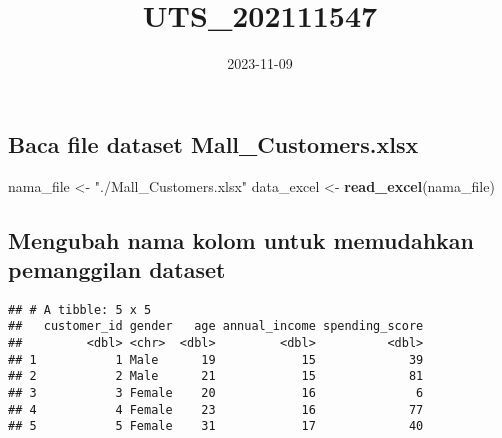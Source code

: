 \documentclass[
]{article}
\title{UTS\_202111547}
\author{}
\date{\vspace{-2.5em}2023-11-09}
\newenvironment{Shaded}{\begin{snugshade}}{\end{snugshade}}
\newcommand{\AttributeTok}[1]{\textcolor[rgb]{0.13,0.29,0.53}{#1}}
\newcommand{\DecValTok}[1]{\textcolor[rgb]{0.00,0.00,0.81}{#1}}
\newcommand{\FunctionTok}[1]{\textcolor[rgb]{0.13,0.29,0.53}{\textbf{#1}}}
\newcommand{\NormalTok}[1]{#1}
\newcommand{\OtherTok}[1]{\textcolor[rgb]{0.56,0.35,0.01}{#1}}
\newcommand{\SpecialCharTok}[1]{\textcolor[rgb]{0.81,0.36,0.00}{\textbf{#1}}}
\newcommand{\StringTok}[1]{\textcolor[rgb]{0.31,0.60,0.02}{#1}}
\begin{document}
\maketitle

\hypertarget{baca-file-dataset-mall_customers.xlsx}{%
\subsection{Baca file dataset
Mall\_Customers.xlsx}\label{baca-file-dataset-mall_customers.xlsx}}

\begin{Shaded}
\begin{Highlighting}[]
\NormalTok{nama\_file }\OtherTok{\textless{}{-}} \StringTok{"./Mall\_Customers.xlsx"}
\NormalTok{data\_excel }\OtherTok{\textless{}{-}} \FunctionTok{read\_excel}\NormalTok{(nama\_file)}
\end{Highlighting}
\end{Shaded}

\hypertarget{mengubah-nama-kolom-untuk-memudahkan-pemanggilan-dataset}{%
\subsection{Mengubah nama kolom untuk memudahkan pemanggilan
dataset}\label{mengubah-nama-kolom-untuk-memudahkan-pemanggilan-dataset}}

\begin{Shaded}
\end{Shaded}

\begin{verbatim}
## # A tibble: 5 x 5
##   customer_id gender   age annual_income spending_score
##         <dbl> <chr>  <dbl>         <dbl>          <dbl>
## 1           1 Male      19            15             39
## 2           2 Male      21            15             81
## 3           3 Female    20            16              6
## 4           4 Female    23            16             77
## 5           5 Female    31            17             40
\end{verbatim}
\end{document}
